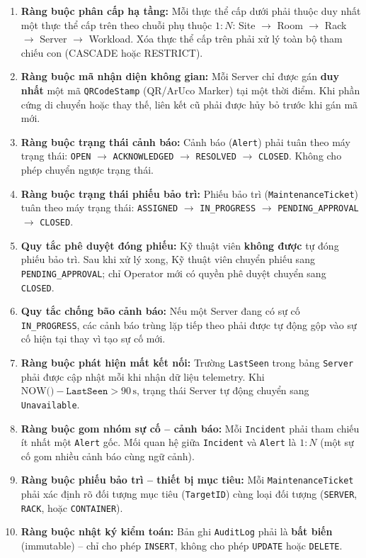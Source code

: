 \begin{enumerate}[label=\textbf{BR-\arabic*}., leftmargin=2.5em]
    \item \textbf{Ràng buộc phân cấp hạ tầng:} Mỗi thực thể cấp dưới phải thuộc duy nhất một thực thể cấp trên theo chuỗi phụ thuộc $1{:}N$: Site $\rightarrow$ Room $\rightarrow$ Rack $\rightarrow$ Server $\rightarrow$ Workload. Xóa thực thể cấp trên phải xử lý toàn bộ tham chiếu con (CASCADE hoặc RESTRICT).
    \item \textbf{Ràng buộc mã nhận diện không gian:} Mỗi Server chỉ được gán \textbf{duy nhất} một mã \texttt{QRCodeStamp} (QR/ArUco Marker) tại một thời điểm. Khi phần cứng di chuyển hoặc thay thế, liên kết cũ phải được hủy bỏ trước khi gán mã mới.
    \item \textbf{Ràng buộc trạng thái cảnh báo:} Cảnh báo (\texttt{Alert}) phải tuân theo máy trạng thái: \texttt{OPEN} $\rightarrow$ \texttt{ACKNOWLEDGED} $\rightarrow$ \texttt{RESOLVED} $\rightarrow$ \texttt{CLOSED}. Không cho phép chuyển ngược trạng thái.
    \item \textbf{Ràng buộc trạng thái phiếu bảo trì:} Phiếu bảo trì (\texttt{MaintenanceTicket}) tuân theo máy trạng thái: \texttt{ASSIGNED} $\rightarrow$ \texttt{IN\_PROGRESS} $\rightarrow$ \texttt{PENDING\_APPROVAL} $\rightarrow$ \texttt{CLOSED}.
    \item \textbf{Quy tắc phê duyệt đóng phiếu:} Kỹ thuật viên \textbf{không được} tự đóng phiếu bảo trì. Sau khi xử lý xong, Kỹ thuật viên chuyển phiếu sang \texttt{PENDING\_APPROVAL}; chỉ Operator mới có quyền phê duyệt chuyển sang \texttt{CLOSED}.
    \item \textbf{Quy tắc chống bão cảnh báo:} Nếu một Server đang có sự cố \texttt{IN\_PROGRESS}, các cảnh báo trùng lặp tiếp theo phải được tự động gộp vào sự cố hiện tại thay vì tạo sự cố mới.
    \item \textbf{Ràng buộc phát hiện mất kết nối:} Trường \texttt{LastSeen} trong bảng \texttt{Server} phải được cập nhật mỗi khi nhận dữ liệu telemetry. Khi $\text{NOW()} - \texttt{LastSeen} > 90\,\text{s}$, trạng thái Server tự động chuyển sang \texttt{Unavailable}.
    \item \textbf{Ràng buộc gom nhóm sự cố -- cảnh báo:} Mỗi \texttt{Incident} phải tham chiếu ít nhất một \texttt{Alert} gốc. Mối quan hệ giữa \texttt{Incident} và \texttt{Alert} là $1{:}N$ (một sự cố gom nhiều cảnh báo cùng ngữ cảnh).
    \item \textbf{Ràng buộc phiếu bảo trì -- thiết bị mục tiêu:} Mỗi \texttt{MaintenanceTicket} phải xác định rõ đối tượng mục tiêu (\texttt{TargetID}) cùng loại đối tượng (\texttt{SERVER}, \texttt{RACK}, hoặc \texttt{CONTAINER}).
    \item \textbf{Ràng buộc nhật ký kiểm toán:} Bản ghi \texttt{AuditLog} phải là \textbf{bất biến} (immutable) -- chỉ cho phép \texttt{INSERT}, không cho phép \texttt{UPDATE} hoặc \texttt{DELETE}.
\end{enumerate}

